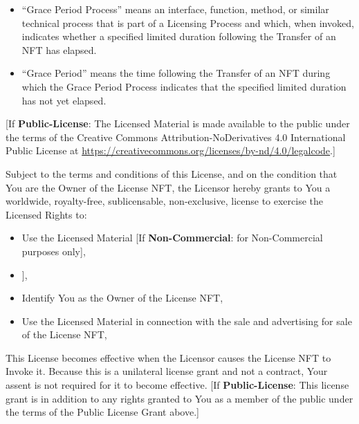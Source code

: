 \documentclass{article}
\newcommand{\keyword}[1]{\textbf{#1}\xspace}
\newcommand{\publiclicense}{\keyword{Public-License}}
\newcommand{\noncommercial}{\keyword{Non-Commercial}}
\newcommand{\sharealike}{\keyword{Share-Alike}}
\newcommand{\derivativetracking}{\keyword{Derivative-Tracking}}
\newcommand{\noderivative}{\keyword{No-Derivatives}}
\newcommand{\sect}[1]{\vspace{12pt}\noindent{\strong{#1}}}
\newcommand{\iflicenseoption}[2]{[\colorbox{light-gray}{If #1:} #2]}
\newcommand{\ifnotlicenseoption}[2]{[\colorbox{light-gray}{Unless #1:} #2]}
\begin{document}
\begin{sffamily}
\begin{itemize}
	\item ``Grace Period Process'' means an interface, function, method, or similar technical process that is part of a Licensing Process and which, when invoked, indicates whether a specified limited duration following the Transfer of an NFT has elapsed.
	
	\item ``Grace Period'' means the time following the Transfer of an NFT during which the Grace Period Process indicates that the specified limited duration has not yet elapsed.
	
	\end{itemize}


\sect{Public License Grant}

\iflicenseoption{\publiclicense}{The Licensed Material is made available to the public under the terms of the Creative Commons Attribution-NoDerivatives 4.0 International Public License at \href{https://creativecommons.org/licenses/by-nd/4.0/legalcode}{https://creativecommons.org/licenses/by-nd/4.0/legalcode}.}

\sect{NFT License Grant}

Subject to the terms and conditions of this License, and on the condition that You are the Owner of the License NFT, the Licensor hereby grants to You a worldwide, royalty-free, sublicensable, non-exclusive, license to exercise the Licensed Rights to:
\begin{itemize}
\item Use the Licensed Material \iflicenseoption{\noncommercial}{for Non-Commercial purposes only},
\item \ifnotlicenseoption{\noderivative}{Create and Use Adapted Material \iflicenseoption{\noncommercial}{for Non-Commercial purposes only} \iflicenseoption{\derivativetracking}{provided that the Adapted Material is Derivative Tracked from the License NFT} \iflicenseoption{\sharealike}{provided that the Adapted Material is Share-Alike Sublicensed from the License NFT}},
\item Identify You as the Owner of the License NFT,
\item Use the Licensed Material in connection with the sale and advertising for sale of the License NFT,
\end{itemize}
This License becomes effective when the Licensor causes the License NFT to Invoke it. Because this is a unilateral license grant and not a contract, Your assent is not required for it to become effective. \iflicenseoption{\publiclicense}{This license grant is in addition to any rights granted to You as a member of the public under the terms of the Public License Grant above.}


\end{sffamily}
\end{document}
